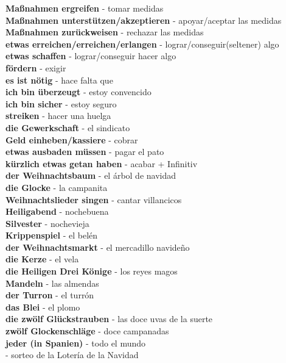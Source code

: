 \documentclass{article}
\title{\vspace{-3cm}}
\author{Andreas Hofer}
\begin{document}
	\begin{multicols}{2}
	\textbf{Maßnahmen ergreifen} - tomar medidas \\
	\textbf{Maßnahmen unterstützen/akzeptieren} - apoyar/aceptar las medidas \\
	\textbf{Maßnahmen zurückweisen} - rechazar las medidas \\
	\textbf{etwas erreichen/erreichen/erlangen} - lograr/conseguir(seltener) algo \\
	\textbf{etwas schaffen} - lograr/conseguir hacer algo \\
	\textbf{fördern} - exigir \\
	\textbf{es ist nötig} - hace falta que \\
	\textbf{ich bin überzeugt} - estoy convencido \\
	\textbf{ich bin sicher} - estoy seguro \\
	\textbf{streiken} - hacer una huelga \\
	\textbf{die Gewerkschaft} - el sindicato \\
	\textbf{Geld einheben/kassiere } - cobrar \\
	\textbf{etwas ausbaden müssen} - pagar el pato \\
	\textbf{kürzlich etwas getan haben} - acabar + Infinitiv \\
	\textbf{der Weihnachtsbaum} - el árbol de navidad \\
	\textbf{die Glocke} - la campanita \\
	\textbf{Weihnachtslieder singen} - cantar villancicos \\
	\textbf{Heiligabend} - nochebuena \\
	\textbf{Silvester} - nochevieja \\
	\textbf{Krippenspiel} - el belén \\
	\textbf{der Weihnachtsmarkt} - el mercadillo navideño \\
	\textbf{die Kerze} - el vela \\
	\textbf{die Heiligen Drei Könige} - los reyes magos \\
	\textbf{Mandeln} - las almendas \\
	\textbf{der Turron} - el turrón \\
	\textbf{das Blei} - el plomo \\
	\textbf{die zwölf Glückstrauben} - las doce uvas de la suerte \\
	\textbf{zwölf Glockenschläge} - doce campanadas \\
	\textbf{jeder (in Spanien)} - todo el mundo \\
	\textbf{} - sorteo de la Lotería de la Navidad \\
	
	
	\end{multicols}
	
\end{document}
